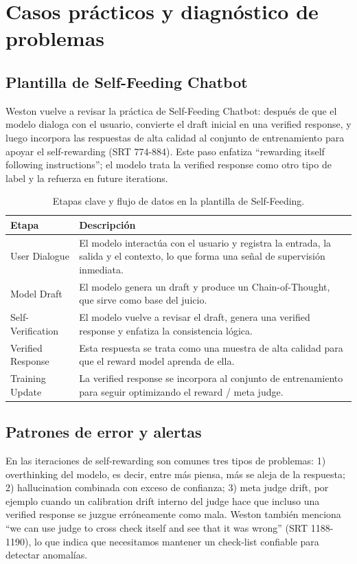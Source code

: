 \section{Casos prácticos y diagnóstico de problemas}
\subsection{Plantilla de Self-Feeding Chatbot}
Weston vuelve a revisar la práctica de Self-Feeding Chatbot: después de que el modelo dialoga con el usuario, convierte el draft inicial en una verified response, y luego incorpora las respuestas de alta calidad al conjunto de entrenamiento para apoyar el self-rewarding (SRT 774-884). Este paso enfatiza ``rewarding itself following instructions''; el modelo trata la verified response como otro tipo de label y la refuerza en future iterations.

\begin{table}[H]
\centering
\begin{tabular}{p{4cm}p{10cm}}
\toprule
Etapa & Descripción \\
\midrule
User Dialogue & El modelo interactúa con el usuario y registra la entrada, la salida y el contexto, lo que forma una señal de supervisión inmediata. \\
Model Draft & El modelo genera un draft y produce un Chain-of-Thought, que sirve como base del juicio. \\
Self-Verification & El modelo vuelve a revisar el draft, genera una verified response y enfatiza la consistencia lógica. \\
Verified Response & Esta respuesta se trata como una muestra de alta calidad para que el reward model aprenda de ella. \\
Training Update & La verified response se incorpora al conjunto de entrenamiento para seguir optimizando el reward / meta judge. \\
\bottomrule
\end{tabular}
\caption{Etapas clave y flujo de datos en la plantilla de Self-Feeding.}
\end{table}

\subsection{Patrones de error y alertas}
En las iteraciones de self-rewarding son comunes tres tipos de problemas: 1) overthinking del modelo, es decir, entre más piensa, más se aleja de la respuesta; 2) hallucination combinada con exceso de confianza; 3) meta judge drift, por ejemplo cuando un calibration drift interno del judge hace que incluso una verified response se juzgue erróneamente como mala. Weston también menciona ``we can use judge to cross check itself and see that it was wrong'' (SRT 1188-1190), lo que indica que necesitamos mantener un check-list confiable para detectar anomalías.


